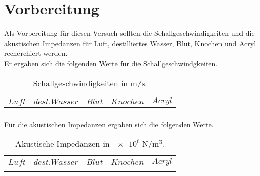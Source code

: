 \section{Vorbereitung}

    Als Vorbereitung für diesen Versuch sollten die Schallgeschwindigkeiten und die akustischen Impedanzen für Luft,
    destilliertes Wasser, Blut, Knochen und Acryl recherchiert werden.\\
    Er ergaben sich die folgenden Werte für die Schallgeschwindgkeiten.

    \begin{table}
        \centering
        \caption{Schallgeschwindigkeiten in $\si{\meter \per \second}$.}
        \label{tab:schallgeschwindigkeiten}
        \begin{tabular}{c c c c c}
            \toprule
            $Luft$ & $dest. Wasser$ & $Blut$ & $Knochen$ & $Acryl$\\
            \midrule
             &  &  &  &  \\
            \bottomrule
        \end{tabular}
    \end{table}

    Für die akustischen Impedanzen ergaben sich die folgenden Werte.

    \begin{table}
        \centering
        \caption{Akustische Impedanzen in $\SI{e6}{\newton \per \meter^3}$.}
        \label{tab:akustische_impedanzen}
        \begin{tabular}{c c c c c}
            \toprule
            $Luft$ & $dest. Wasser$ & $Blut$ & $Knochen$ & $Acryl$\\
            \midrule
             &  &  &  &  \\
            \bottomrule
        \end{tabular}
    \end{table}